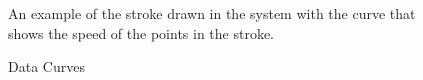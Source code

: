 \documentclass[a4paper,10pt]{IEEEconf}
\begin{document}
%	
%		
%
\begin{figure}[]
	\centering
	\caption{Data Curves} An example of the stroke drawn in the system with the curve that shows the speed of the points in the stroke.%
\end{figure}
\end{document}
